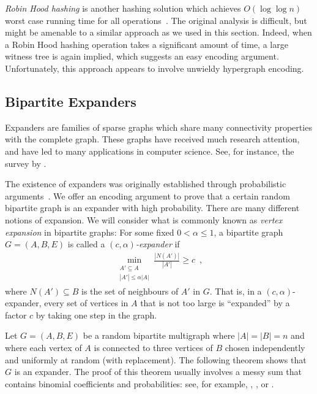 \documentclass[format=acmsmall, review=false, screen=true]{acmart}
\begin{document}
\begin{rem}
  \emph{Robin Hood hashing} is another hashing solution which achieves
  $O(\log \log n)$ worst case running time for all
  operations~\cite{devroye:robin}. The original analysis is difficult,
  but might be amenable to a similar approach as we used in
  this section. Indeed, when a Robin Hood hashing operation takes a
  significant amount of time, a large witness tree is again implied,
  which suggests an easy encoding argument. Unfortunately, this
  approach appears to involve unwieldy hypergraph encoding.
\end{rem}


\subsection{Bipartite Expanders}

Expanders are families of sparse graphs which share many connectivity
properties with the complete graph. These
graphs have received much research attention, and have led to many
applications in computer science. See, for instance, the survey by
.

The existence of expanders was originally
established through probabilistic arguments~\cite{pinsker:expanders}.
We offer an encoding argument to prove that a certain random bipartite
graph is an expander with high probability. There are many different
notions of expansion. We will consider what is commonly known as
\emph{vertex expansion} in bipartite graphs: For some fixed
$0 < \alpha \leq 1$, a bipartite graph $G = (A, B, E)$ is called a
\emph{$(c, \alpha)$-expander} if
\begin{align*}
  \min_{\substack{{A' \subseteq A}\\{|A'| \leq \alpha |A|}}} \frac{|N(A')|}{|A'|} \geq c \enspace ,
\end{align*}
where $N(A') \subseteq B$ is the set of neighbours of $A'$ in $G$.
That is, in a $(c, \alpha)$-expander, every set  of vertices in
$A$ that is not too large is ``expanded'' by a factor $c$ by taking
one step in the graph.

Let $G = (A, B, E)$ be a random bipartite multigraph where
$|A| = |B| = n$ and where each vertex of $A$ is connected to three
vertices of $B$ chosen independently and uniformly at random (with
replacement). The following theorem shows that $G$ is an expander.
The proof of this theorem usually involves a messy sum that contains
binomial coefficients and probabilities: see, for example, 
,
, or 
.
\end{document}
